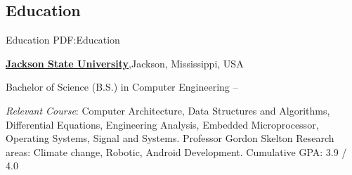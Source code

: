 \documentclass[letterpaper,10pt,oneside]{article}
\begin{document}
\begin{body}


\section
{Education}
{Education}
{PDF:Education}

\href{http://www.example.com/my-university}
{\textbf{Jackson State University}},Jackson, Mississippi, USA

\GapNoBreak
\BulletItem
Bachelor of Science (B.S.) in
{Computer Engineering}
\hfill
{} --
\begin{detail}
\SubBulletItem
{\textit{Relevant Course}}: Computer Architecture, Data Structures and Algorithms, Differential Equations,  Engineering Analysis, Embedded Microprocessor, Operating Systems, Signal and Systems. 
\SubBulletItem
Professor Gordon Skelton
Research areas:
Climate change, Robotic, Android Development.
\SubBulletItem
Cumulative GPA: 3.9 / 4.0
\end{detail}







\end{body}
\end{document}
